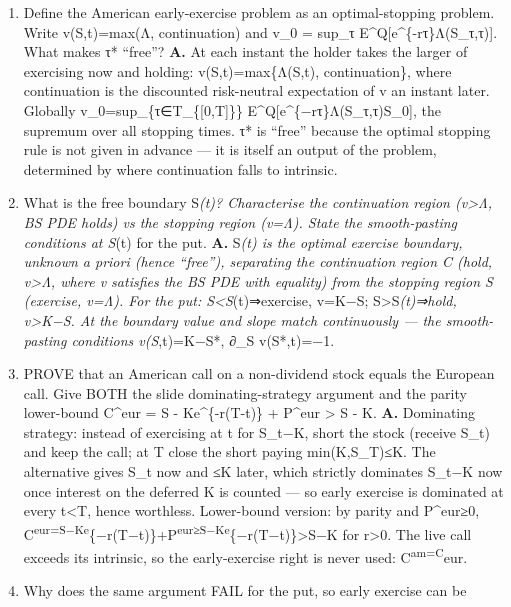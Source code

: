 \documentclass[
  11pt,
]{article}
\providecommand{\tightlist}{%
  \setlength{\itemsep}{0pt}\setlength{\parskip}{0pt}}
\begin{document}
\begin{enumerate}
\def\labelenumi{\arabic{enumi}.}
\tightlist
\item
  Define the American early-exercise problem as an optimal-stopping
  problem. Write v(S,t)=max(Λ, continuation) and v\_0 = sup\_τ
  E\^{}Q{[}e\^{}\{-rτ\}Λ(S\_τ,τ){]}. What makes τ* ``free''? \textbf{A.}
  At each instant the holder takes the larger of exercising now and
  holding: v(S,t)=max\{Λ(S,t), continuation\}, where continuation is the
  discounted risk-neutral expectation of v an instant later. Globally
  v\_0=sup\_\{τ∈T\_\{{[}0,T{]}\}\}
  E\^{}Q{[}e\^{}\{−rτ\}Λ(S\_τ,τ)\textbar S\_0{]}, the supremum over all
  stopping times. τ* is ``free'' because the optimal stopping rule is
  not given in advance --- it is itself an output of the problem,
  determined by where continuation falls to intrinsic.
\item
  What is the free boundary S\emph{(t)? Characterise the continuation
  region (v\textgreater Λ, BS PDE holds) vs the stopping region (v=Λ).
  State the smooth-pasting conditions at S}(t) for the put. \textbf{A.}
  S\emph{(t) is the optimal exercise boundary, unknown a priori (hence
  ``free''), separating the continuation region C (hold,
  v\textgreater Λ, where v satisfies the BS PDE with equality) from the
  stopping region S (exercise, v=Λ). For the put:
  S\textless S}(t)⇒exercise, v=K−S; S\textgreater S\emph{(t)⇒hold,
  v\textgreater K−S. At the boundary value and slope match continuously
  --- the smooth-pasting conditions v(S},t)=K−S*, ∂\_S v(S*,t)=−1.
\item
  PROVE that an American call on a non-dividend stock equals the
  European call. Give BOTH the slide dominating-strategy argument and
  the parity lower-bound C\^{}eur = S - Ke\^{}\{-r(T-t)\} + P\^{}eur
  \textgreater{} S - K. \textbf{A.} Dominating strategy: instead of
  exercising at t for S\_t−K, short the stock (receive S\_t) and keep
  the call; at T close the short paying min(K,S\_T)≤K. The alternative
  gives S\_t now and ≤K later, which strictly dominates S\_t−K now once
  interest on the deferred K is counted --- so early exercise is
  dominated at every t\textless T, hence worthless. Lower-bound version:
  by parity and P\^{}eur≥0,
  C\textsuperscript{eur=S−Ke}\{−r(T−t)\}+P\textsuperscript{eur≥S−Ke}\{−r(T−t)\}\textgreater S−K
  for r\textgreater0. The live call exceeds its intrinsic, so the
  early-exercise right is never used: C\textsuperscript{am=C}eur.
\item
  Why does the same argument FAIL for the put, so early exercise can be

\end{enumerate}
\end{document}
